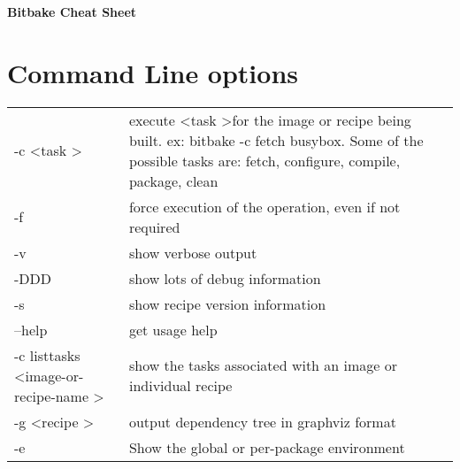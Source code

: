\documentclass[10pt,a4paper,landscape]{article}
\newcommand*\keystroke[1]{%
  \tikz[baseline=(key.base)]
    \node[%
      draw,
      fill=white,
      drop shadow={shadow xshift=0.25ex,shadow yshift=-0.25ex,fill=black,opacity=0.75},
      rectangle,
      rounded corners=2pt,
      inner sep=1pt,
      line width=0.5pt,
      font=\scriptsize\sffamily
    ](key) {~#1~\strut}
  ;
}
\renewcommand{\familydefault}{\sfdefault}
\begin{document}

\newcommand{\ret}{\keystroke{$\hookleftarrow$}}
\newcommand{\shift}{\keystroke{$\Uparrow~$}}
\newcommand{\alt}{\keystroke{Alt}}
\newcommand{\up}{\keystroke{$\uparrow$}}
\newcommand{\down}{\keystroke{$\downarrow$}}
\newcommand{\bkspc}{\keystroke{$\longmapsfrom$}}
\newcommand{\ctrl}[1]{\texttt{\keystroke{Ctrl}#1}}

\raggedright
\footnotesize
\begin{multicols}{2}

\begin{center}
     \Large{\textbf{Bitbake Cheat Sheet}} \\
\end{center}


\section{Command Line options}

\begin{tabular}{p{5cm}p{\linewidth - 5.9cm}}
-c \textless task \textgreater & execute \textless task \textgreater for the image or recipe being built. ex: bitbake -c fetch busybox. Some of the possible tasks are: fetch, configure, compile, package, clean \\
-f & force execution of the operation, even if not required \\
-v & show verbose output \\
-DDD & show lots of debug information \\
-s & show recipe version information \\
--help & get usage help \\
-c listtasks \textless image-or-recipe-name \textgreater & show the tasks associated with an image or individual recipe \\
-g \textless recipe \textgreater & output dependency tree in graphviz format \\
-e &  Show the global or per-package environment
\end{tabular}


\end{multicols}
\end{document}
